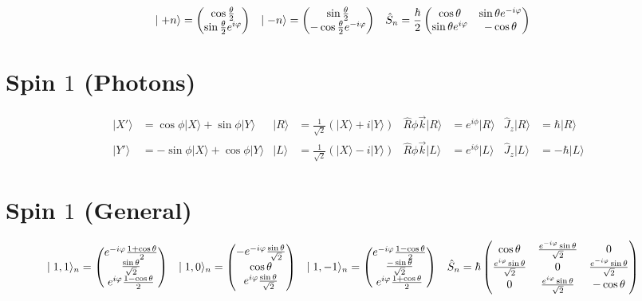 \documentclass{article}
\newcommand{\mysection}[1]{\vspace{-2em}
\section*{#1}
\vspace{-2em}}
\newcommand{\ket}[1]{\ensuremath{\mid#1\rangle}}
\newcommand{\op}[1]{\ensuremath{\hat#1}}
\newcommand{\mat}[1]{\begin{pmatrix}\ensuremath{#1}\end{pmatrix}}
\begin{document}
	\begin{align*}
		\ket{+n}&=\mat{\cos\frac{\theta}{2}\\
			\sin\frac{\theta}{2}e^{i\varphi}} &
		\ket{-n}&=\mat{\sin\frac{\theta}{2}\\
			-\cos\frac{\theta}{2}e^{-i\varphi}} &
		\op{S_n}&=\frac{\hbar}{2}\mat{\cos\theta&\sin\theta e^{-i\varphi}\\
			\sin\theta e^{i\varphi}&-\cos\theta} %
	\end{align*}
	\mysection{Spin $1$ (Photons)}
	\begin{align*}
		\ket{X'}&=\cos\phi\ket{X}+\sin\phi\ket{Y} &
		\ket{R}&=\frac{1}{\sqrt{2}}(\ket{X}+i\ket{Y}) &
		\op{R\phi\vec{k}}\ket{R}&=e^{i\phi}\ket{R} &
		\op{J_z}\ket{R}&=\hbar\ket{R} \\
		\ket{Y'}&=-\sin\phi\ket{X}+\cos\phi\ket{Y} &
		\ket{L}&=\frac{1}{\sqrt{2}}(\ket{X}-i\ket{Y}) &
		\op{R\phi\vec{k}}\ket{L}&=e^{i\phi}\ket{L} &
		\op{J_z}\ket{L}&=-\hbar\ket{L}
	\end{align*}
	\mysection{Spin $1$ (General)}
	\begin{align*}
		\ket{1,1}_n&=\mat{e^{-i\varphi}\frac{1+\cos\theta}{2}\\
			\frac{\sin\theta}{\sqrt2}\\
			e^{i\varphi}\frac{1-\cos\theta}{2}} &
		\ket{1,0}_n&=\mat{-e^{-i\varphi}\frac{\sin\theta}{\sqrt2}\\
			\cos\theta\\e^{i\varphi}\frac{\sin\theta}{\sqrt2}} &
		\ket{1,-1}_n&=\mat{e^{-i\varphi}\frac{1-\cos\theta}{2}\\
			\frac{-\sin\theta}{\sqrt2}\\
			e^{i\varphi}\frac{1+\cos\theta}{2}} &
		\op{S_n}&=\hbar\mat{
			\cos\theta&\frac{e^{-i\varphi}\sin\theta}{\sqrt2}&0\\
			\frac{e^{i\varphi}\sin\theta}{\sqrt{2}}&0&
				\frac{e^{-i\varphi}\sin\theta}{\sqrt2}\\
			0&\frac{e^{i\varphi}\sin\theta}{\sqrt2}&-\cos\theta}
	\end{align*}
\end{document}
